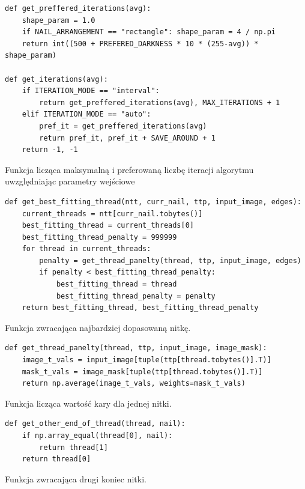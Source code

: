 \documentclass[a4paper, 12pt, polish, twoside]{extreport}
\begin{document}
        \begin{code}[H]
        \begin{verbatim}
def get_preffered_iterations(avg):
    shape_param = 1.0
    if NAIL_ARRANGEMENT == "rectangle": shape_param = 4 / np.pi
    return int((500 + PREFERED_DARKNESS * 10 * (255-avg)) * shape_param)

def get_iterations(avg):
    if ITERATION_MODE == "interval":
        return get_preffered_iterations(avg), MAX_ITERATIONS + 1
    elif ITERATION_MODE == "auto":
        pref_it = get_preffered_iterations(avg)
        return pref_it, pref_it + SAVE_AROUND + 1
    return -1, -1
        \end{verbatim}
        \caption{Funkcja licząca maksymalną i preferowaną liczbę iteracji algorytmu uwzględniając parametry wejściowe}
        \label{imp-art-algorithm-iterations-code}
        \end{code}
        
        \begin{code}[H]
        \begin{verbatim}
def get_best_fitting_thread(ntt, curr_nail, ttp, input_image, edges): 
    current_threads = ntt[curr_nail.tobytes()]
    best_fitting_thread = current_threads[0]
    best_fitting_thread_penalty = 999999
    for thread in current_threads:
        penalty = get_thread_panelty(thread, ttp, input_image, edges)
        if penalty < best_fitting_thread_penalty:
            best_fitting_thread = thread
            best_fitting_thread_penalty = penalty
    return best_fitting_thread, best_fitting_thread_penalty
        \end{verbatim}
        \caption{Funkcja zwracająca najbardziej dopasowaną nitkę.}
        \label{imp-art-algorithm-thread-select-code}
        \end{code}
        
        \begin{code}[H]
        \begin{verbatim}
def get_thread_panelty(thread, ttp, input_image, image_mask):
    image_t_vals = input_image[tuple(ttp[thread.tobytes()].T)] 
    mask_t_vals = image_mask[tuple(ttp[thread.tobytes()].T)] 
    return np.average(image_t_vals, weights=mask_t_vals)
        \end{verbatim}
        \caption{Funkcja licząca wartość kary dla jednej nitki.}
        \label{imp-art-algorithm-penalty-calc-code}
        \end{code}
        
        \begin{code}[H]
        \begin{verbatim}
def get_other_end_of_thread(thread, nail):
    if np.array_equal(thread[0], nail):
        return thread[1]
    return thread[0]
        \end{verbatim}
        \caption{Funkcja zwracająca drugi koniec nitki.}
        \label{imp-art-other-end-code}
        \end{code}
        
\end{document}
